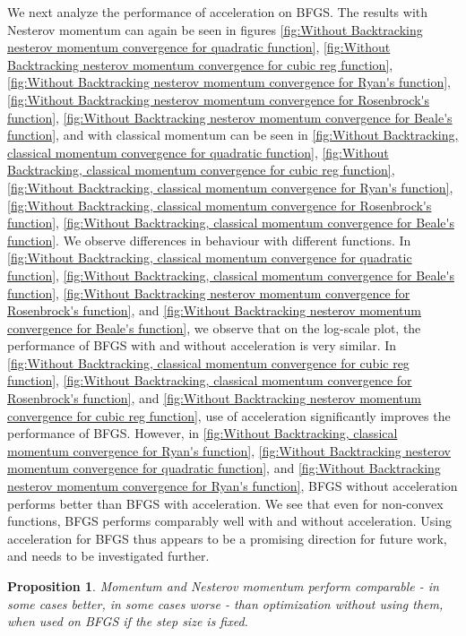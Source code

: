\documentclass{article}
\newtheorem{prop}{Proposition}
\begin{document}
We next analyze the performance of acceleration on BFGS. The results with Nesterov momentum can again be seen in	figures \ref{fig:Without Backtracking nesterov momentum convergence for quadratic function},
\ref{fig:Without Backtracking nesterov momentum convergence for cubic reg function},
\ref{fig:Without Backtracking nesterov momentum convergence for Ryan's function},
\ref{fig:Without Backtracking nesterov momentum convergence for Rosenbrock's function},
\ref{fig:Without Backtracking nesterov momentum convergence for Beale's function}, and with classical momentum can be seen in \ref{fig:Without Backtracking, classical momentum convergence for quadratic function},
\ref{fig:Without Backtracking, classical momentum convergence for cubic reg function},
\ref{fig:Without Backtracking, classical momentum convergence for Ryan's function},
\ref{fig:Without Backtracking, classical momentum convergence for Rosenbrock's function},
\ref{fig:Without Backtracking, classical momentum convergence for Beale's function}. We observe differences in behaviour with different functions. In \ref{fig:Without Backtracking, classical momentum convergence for quadratic function}, \ref{fig:Without Backtracking, classical momentum convergence for Beale's function}, \ref{fig:Without Backtracking nesterov momentum convergence for Rosenbrock's function}, and \ref{fig:Without Backtracking nesterov momentum convergence for Beale's function}, we observe that on the log-scale plot, the performance of BFGS with and without acceleration is very similar. In \ref{fig:Without Backtracking, classical momentum convergence for cubic reg function}, \ref{fig:Without Backtracking, classical momentum convergence for Rosenbrock's function}, and \ref{fig:Without Backtracking nesterov momentum convergence for cubic reg function}, use of acceleration significantly improves the performance of BFGS. However, in \ref{fig:Without Backtracking, classical momentum convergence for Ryan's function}, \ref{fig:Without Backtracking nesterov momentum convergence for quadratic function}, and \ref{fig:Without Backtracking nesterov momentum convergence for Ryan's function}, BFGS without acceleration performs better than BFGS with acceleration. We see that even for non-convex functions, BFGS performs comparably well with and without acceleration. Using acceleration for BFGS thus appears to be a promising direction for future work, and needs to be investigated further.

\begin{prop}
	Momentum and Nesterov momentum perform comparable - in some cases better, in some cases worse - than optimization without using them, when used on BFGS if the step size is fixed.
\end{prop}
\end{document}
